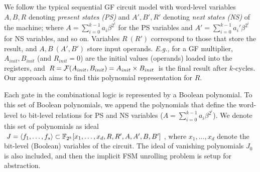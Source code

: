 \begin{figure}[hbt]
\end{figure}

We follow  the typical sequential GF circuit model with word-level variables $A, B, R$
denoting {\it present states (PS)} and $A', B', R'$ denoting {\it next
  states (NS)} of the machine; where $A = \sum_{i=0}^{k-1} a_i \beta^{2^i}$
for the PS variables and $A' = \sum_{i=0}^{k-1} a_i'
\beta^{2^i}$ for NS variables, and so on.  Variables $R\ (R')$ correspond to those that 
store the result, and $A, B\ (A', B')$ store input operands. {\it E.g.,}
for a GF multiplier, $A_{init}, B_{init}$ (and $R_{init} =
0$) are the initial values (operands) loaded into the registers,  and
$R = {\mathcal{F}}(A_{init}, B_{init}) = A_{init} \times B_{init}$ is the final
result after $k$-cycles. Our approach aims to find this polynomial
representation for $R$.  

Each gate in the combinational logic is represented by a Boolean
polynomial. To 
this set of Boolean polynomials, we append the polynomials that define
the word-level to bit-level relations for PS and NS variables ($A =
\sum_{i=0}^{k-1} a_i \beta^{2^i}$). We denote this set of polynomials
as ideal $J = \langle 
f_1, \dots, f_s \rangle \subset {\mathbb{F}}_{2^k}[x_1, \dots, x_d, R, R', A, A', B,
  B']$, where $x_1, \dots, x_d$ denote the bit-level (Boolean) variables
  of the circuit. The ideal of vanishing polynomials $J_0$ is also included, and
then the implicit FSM unrolling problem is setup for abstraction. 

